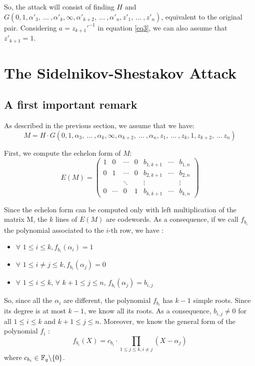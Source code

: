 \documentclass[12pt,a4paper,titlepage]{article}
\begin{document}
So, the attack will consist of finding $H$ and $G(0, 1,\alpha'_3, \ ... \ ,\alpha'_k, \infty, \alpha'_{k+2}, \ ... \ , \alpha'_n, z'_1, \ ... \ , z'_n)$, equivalent to the original pair. 
Considering $a=z_{k+1}'^{-1}$ in equation \eqref{eq3}, we can also assume that $z'_{k+1}=1$.


\newpage
\section{The Sidelnikov-Shestakov Attack}
\label{sec:SSattack}
\subsection{A first important remark}

As described in the previous section, we assume that we have:
$$ M = H\cdot G(0, 1,\alpha_3, \ ... \ ,\alpha_k, \infty, \alpha_{k+2}, \ ... \ , \alpha_n, z_1, \ ... \ , z_k, 1, z_{k+2}, \ ... \, z_n) $$


First, we compute the echelon form of $M$:
$$ E(M) = 
\left(
\begin{array}{ccccccc}
1 & 0 & \cdots & 0 & b_{1,k+1} & \cdots & b_{1,n} \\
0 & 1 & \cdots & 0 & b_{2,k+1} & \cdots & b_{2,n} \\
  &   & \ddots &   & \vdots &   & \vdots \\
0 & \cdots & 0 & 1 & b_{k,k+1} & \cdots & b_{k,n}
\end{array}
\right)
$$

Since the echelon form can be computed only with left multiplication of the matrix M, the $k$ lines of $E(M)$ are codewords. As a consequence, if we call $f_{b_i}$ the polynomial associated to the $i$-th
row, we have :
\begin{itemize}
\item $\forall$  $1\leq i\leq k, f_{b_i}(\alpha_i)=1 $
\item $\forall$  $1\leq i\neq j\leq k, f_{b_i}(\alpha_j)=0 $
\item $\forall$  $1\leq i\leq k$, $\forall$ $k+1\leq j\leq n$, $f_{b_i}(\alpha_j)=b_{i,j} $
\end{itemize}

So, since all the $\alpha_i$ are different, the polynomial $f_{b_i}$ has $k-1$ simple roots. Since its degree is at most $k-1$, we know all its roots. As a consequence, $b_{i,j}\neq0$ for all $1\leq i\leq k$ and $k+1\leq j\leq n$. Moreover, we know the general 
form of the polynomial $f_i$ :
\begin{equation}
f_{b_i}(X) = c_{b_i}\cdot \prod_{1\leq j\leq k, i\neq j} (X-\alpha_j)
\label{eq4}
\end{equation}
where $c_{b_i} \in \mathbb{F}_q\backslash\{0\}$.
\end{document}
